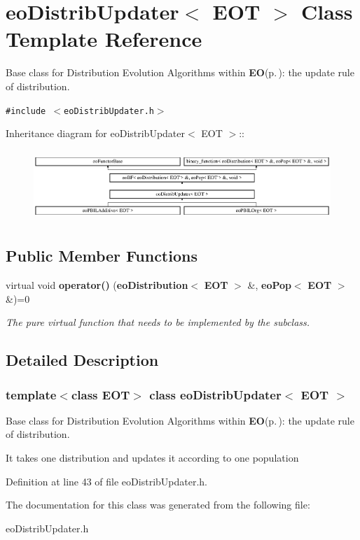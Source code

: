 \section{eo\-Distrib\-Updater$<$ EOT $>$ Class Template Reference}
\label{classeo_distrib_updater}
Base class for Distribution Evolution Algorithms within {\bf EO}{\rm (p.\,\pageref{class_e_o})}: the update rule of distribution.  


{\tt \#include $<$eo\-Distrib\-Updater.h$>$}

Inheritance diagram for eo\-Distrib\-Updater$<$ EOT $>$::\begin{figure}[H]
\begin{center}
\leavevmode
\includegraphics[height=2.71186cm]{classeo_distrib_updater}
\end{center}
\end{figure}
\subsection*{Public Member Functions}
\begin{CompactItemize}
\item 
virtual void {\bf operator()} ({\bf eo\-Distribution}$<$ {\bf EOT} $>$ \&, {\bf eo\-Pop}$<$ {\bf EOT} $>$ \&)=0\label{classeo_distrib_updater_a0}

\begin{CompactList}\small\item\em The pure virtual function that needs to be implemented by the subclass. \item\end{CompactList}\end{CompactItemize}


\subsection{Detailed Description}
\subsubsection*{template$<$class EOT$>$ class eo\-Distrib\-Updater$<$ EOT $>$}

Base class for Distribution Evolution Algorithms within {\bf EO}{\rm (p.\,\pageref{class_e_o})}: the update rule of distribution. 

It takes one distribution and updates it according to one population 



Definition at line 43 of file eo\-Distrib\-Updater.h.

The documentation for this class was generated from the following file:\begin{CompactItemize}
\item 
eo\-Distrib\-Updater.h\end{CompactItemize}
